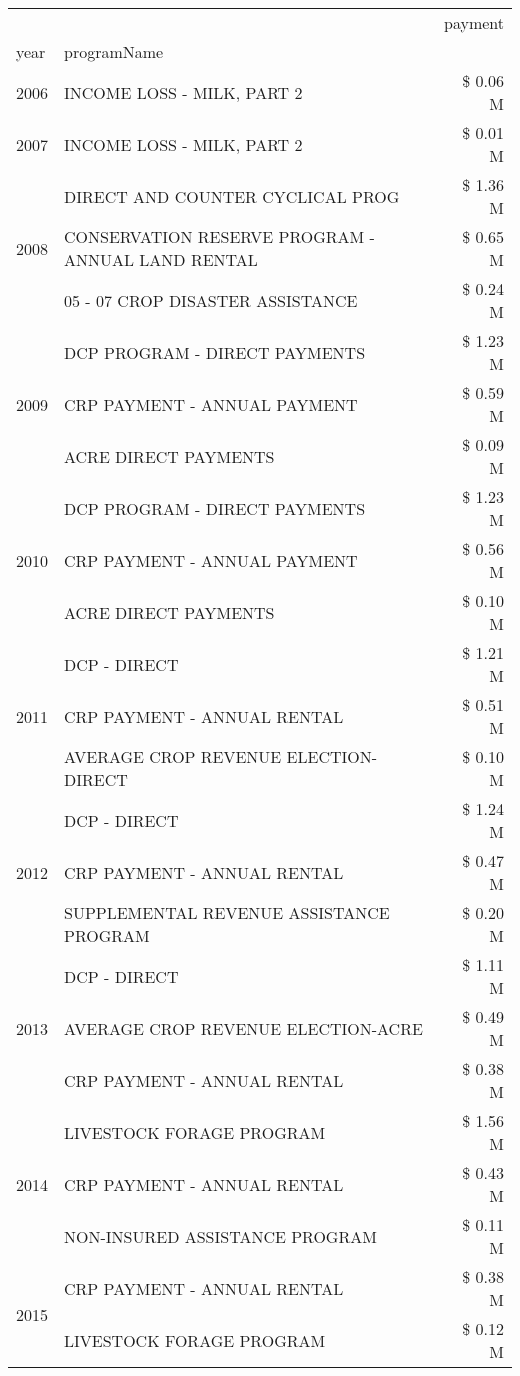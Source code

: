 \begin{tabular}{llr}
\toprule
 &  & payment \\
year & programName &  \\
\midrule
2006 & INCOME LOSS - MILK, PART 2 & \$ 0.06 M \\
\cline{1-3}
2007 & INCOME LOSS - MILK, PART 2 & \$ 0.01 M \\
\cline{1-3}
\multirow[t]{3}{*}{2008} & DIRECT AND COUNTER CYCLICAL PROG & \$ 1.36 M \\
 & CONSERVATION RESERVE PROGRAM - ANNUAL LAND RENTAL & \$ 0.65 M \\
 & 05 - 07 CROP DISASTER ASSISTANCE & \$ 0.24 M \\
\cline{1-3}
\multirow[t]{3}{*}{2009} & DCP PROGRAM - DIRECT PAYMENTS & \$ 1.23 M \\
 & CRP PAYMENT - ANNUAL PAYMENT & \$ 0.59 M \\
 & ACRE DIRECT PAYMENTS & \$ 0.09 M \\
\cline{1-3}
\multirow[t]{3}{*}{2010} & DCP PROGRAM - DIRECT PAYMENTS & \$ 1.23 M \\
 & CRP PAYMENT - ANNUAL PAYMENT & \$ 0.56 M \\
 & ACRE DIRECT PAYMENTS & \$ 0.10 M \\
\cline{1-3}
\multirow[t]{3}{*}{2011} & DCP - DIRECT & \$ 1.21 M \\
 & CRP PAYMENT - ANNUAL RENTAL & \$ 0.51 M \\
 & AVERAGE CROP REVENUE ELECTION-DIRECT & \$ 0.10 M \\
\cline{1-3}
\multirow[t]{3}{*}{2012} & DCP - DIRECT & \$ 1.24 M \\
 & CRP PAYMENT - ANNUAL RENTAL & \$ 0.47 M \\
 & SUPPLEMENTAL REVENUE ASSISTANCE PROGRAM & \$ 0.20 M \\
\cline{1-3}
\multirow[t]{3}{*}{2013} & DCP - DIRECT & \$ 1.11 M \\
 & AVERAGE CROP REVENUE ELECTION-ACRE & \$ 0.49 M \\
 & CRP PAYMENT - ANNUAL RENTAL & \$ 0.38 M \\
\cline{1-3}
\multirow[t]{3}{*}{2014} & LIVESTOCK FORAGE PROGRAM & \$ 1.56 M \\
 & CRP PAYMENT - ANNUAL RENTAL & \$ 0.43 M \\
 & NON-INSURED ASSISTANCE PROGRAM & \$ 0.11 M \\
\cline{1-3}
\multirow[t]{3}{*}{2015} & CRP PAYMENT - ANNUAL RENTAL & \$ 0.38 M \\
 & LIVESTOCK FORAGE PROGRAM & \$ 0.12 M \\

\end{tabular}

